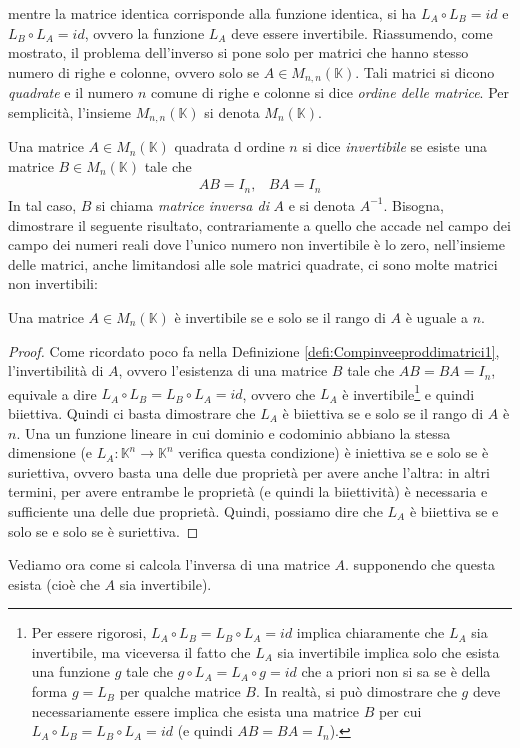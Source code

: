 mentre la matrice identica corrisponde alla funzione identica, si ha $L_A\circ L_B=id$ e $L_B\circ L_A=id$,
ovvero la funzione $L_A$ deve essere invertibile. Riassumendo, come mostrato, il problema dell'inverso si
pone solo per matrici che hanno stesso numero di righe e colonne, ovvero solo se $A\in M_{n,n}(\mathds{K})$.
Tali matrici si dicono \emph{quadrate} e il numero $n$ comune di righe e colonne si dice \textit{ordine delle
  matrice}. Per semplicità, l'insieme $M_{n,n}(\mathds{K})$ si denota $M_n(\mathds{K})$. 
\begin{defi}
  \label{defi:Compinveeproddimatrici1}
  Una matrice $A\in M_n(\mathds{K})$ quadrata d ordine $n$ si dice \textit{invertibile} se esiste una matrice
  $B\in M_n(\mathds{K})$ tale che
  \begin{eqnarray}
    \label{eq:Compinveeproddimatrici8}
    AB=I_n, & BA=I_n
  \end{eqnarray}
  In tal caso, $B$ si chiama \textit{matrice inversa di} $A$ e si denota $A^{-1}$. Bisogna, dimostrare il
  seguente risultato, contrariamente a quello che accade nel campo dei campo dei numeri reali dove l'unico
  numero non invertibile è lo zero, nell'insieme delle matrici, anche limitandosi alle sole matrici quadrate,
  ci sono molte matrici non invertibili:
\end{defi}
\begin{teo}
  \label{teo:Compinveeproddimatrici1}
  Una matrice $A\in M_n(\mathds{K})$ è invertibile se e solo se il rango di $A$ è uguale a $n$.
\end{teo}
\begin{proof}
  Come ricordato poco fa nella Definizione \ref{defi:Compinveeproddimatrici1}, l'invertibilità di $A$, ovvero
  l'esistenza di una matrice $B$ tale che $AB=BA=I_n$, equivale a dire $L_A\circ L_B=L_B\circ L_A=id$, ovvero
  che $L_A$ è invertibile\footnote{Per essere rigorosi, $L_A\circ L_B=L_B\circ L_A=id$ implica chiaramente che
    $L_A$ sia invertibile, ma viceversa il fatto che $L_A$ sia invertibile implica solo che esista una
    funzione $g$ tale che $g\circ L_A=L_A\circ g=id$ che a priori non si sa se è della forma $g=L_B$ per
    qualche matrice $B$. In realtà, si può dimostrare che $g$ deve necessariamente essere implica che esista
    una matrice $B$ per cui $L_A\circ L_B=L_B\circ L_A=id$ (e quindi $AB=BA=I_n$).} e quindi biiettiva. Quindi
  ci basta dimostrare che $L_A$ è biiettiva se e solo se il rango di $A$ è $n$. Una un funzione lineare in cui
  dominio e codominio abbiano la stessa dimensione (e $L_A:\mathds{K}^n\to \mathds{K}^n$ verifica questa
  condizione) è iniettiva se e solo se è suriettiva, ovvero basta una delle due proprietà per avere anche
  l'altra: in altri termini, per avere entrambe le proprietà
  (e quindi la biiettività) è necessaria e sufficiente una delle due
  proprietà. Quindi, possiamo dire che $L_A$ è biiettiva se e solo
  se e solo se è suriettiva. 
\end{proof}
Vediamo ora come si calcola l'inversa di una matrice $A$.
supponendo che questa esista (cioè che $A$ sia invertibile).

